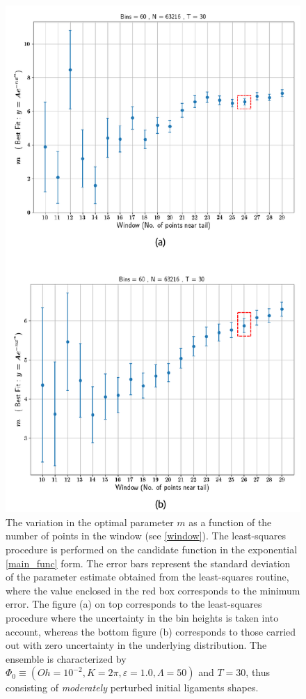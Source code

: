 \begin{figure}
\centering
	\includegraphics{plots/drop_stats/determine_fit_linear.pdf}
\caption{
	The variation in the optimal parameter $m$ as a 
	function of the number of points in the window (see \ref{window}).
	The least-squares procedure is performed on the 
	candidate function in the exponential \eqref{main_func} form.
	The error bars represent the standard deviation of the 
	parameter estimate obtained from the least-squares routine,
	where the value enclosed in the red box corresponds to the minimum error.
	The figure (a) on top corresponds to the least-squares procedure where the 
	uncertainty in the bin heights is taken into account, whereas the bottom
	figure (b) corresponds to those carried out with zero uncertainty in the underlying distribution. 
	The ensemble is characterized by $\Phi_0 \equiv \left( Oh = 10^{-2}, K = 2\pi 
	, \varepsilon = 1.0 , \Lambda = 50 \right)$ and $T = 30$, 
	thus consisting of \textit{moderately} perturbed initial ligaments shapes. 
	}
\label{determine_linear}
\end{figure}


